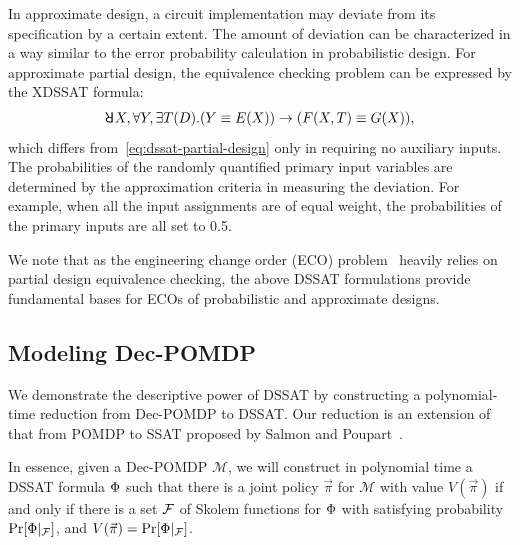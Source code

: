 In approximate design,
a circuit implementation may deviate from its specification by a certain extent.
The amount of deviation can be characterized in a way similar to the error probability calculation in probabilistic design.
For approximate partial design,
the equivalence checking problem can be expressed by the XDSSAT formula:
\begin{align}
    \label{eq:dssat-approximate-design}
    \random{} X,\forall Y,\exists T(D).(Y \equiv E(X)) \limply (F(X,T)\equiv G(X)),
\end{align}
which differs from~\cref{eq:dssat-partial-design} only in requiring no auxiliary inputs.
The probabilities of the randomly quantified primary input variables are determined by the approximation criteria in measuring the deviation.
For example, when all the input assignments are of equal weight,
the probabilities of the primary inputs are all set to 0.5.

We note that as the engineering change order (ECO) problem~\cite{JiangDATE20ECOSurvey} heavily relies on partial design equivalence checking,
the above DSSAT formulations provide fundamental bases for ECOs of probabilistic and approximate designs.

\subsection{Modeling Dec-POMDP}
We demonstrate the descriptive power of DSSAT by constructing a polynomial-time reduction from Dec-POMDP to DSSAT.
Our reduction is an extension of that from POMDP to SSAT proposed by Salmon and Poupart~\cite{Salmon2020}.

In essence, given a Dec-POMDP $\mathcal{M}$,
we will construct in polynomial time a DSSAT formula $\Phi$
such that there is a joint policy $\vec{\pi}$ for $\mathcal{M}$ with value $V(\vec{\pi})$
if and only if there is a set $\mathcal{F}$ of Skolem functions for $\Phi$
with satisfying probability $\Pr[\Phi|_{\mathcal{F}}]$, and $V(\vec{\pi})=\Pr[\Phi|_{\mathcal{F}}]$.

